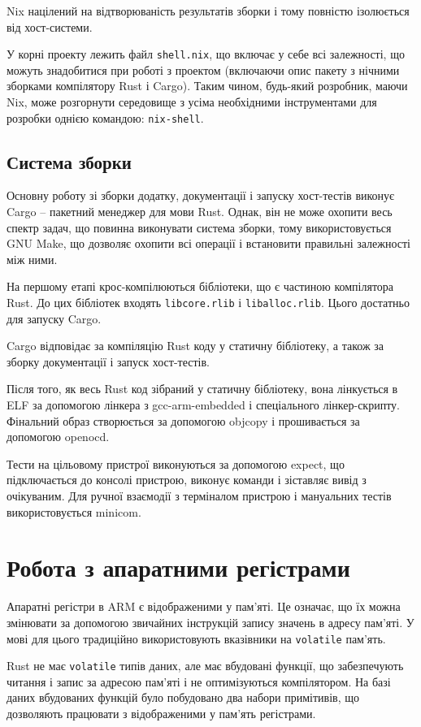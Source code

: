 \documentclass[oneside,14pt,a4paper,final]{myextreport}
\newcommand\code[1]{{\tt #1}}
\begin{document}
Nix націлений на відтворюваність результатів зборки і тому повністю ізолюється від хост-системи.

У корні проекту лежить файл \code{shell.nix}, що включає у себе всі залежності, що можуть знадобитися при роботі з проектом (включаючи опис пакету з нічними зборками компілятору Rust і Cargo). Таким чином, будь-який розробник, маючи Nix, може розгорнути середовище з усіма необхідними інструментами для розробки однією командою: \code{nix-shell}.

\subsection{Система зборки}

Основну роботу зі зборки додатку, документації і запуску хост-тестів виконує Cargo -- пакетний менеджер для мови Rust. Однак, він не може охопити весь спектр задач, що повинна виконувати система зборки, тому використовується GNU Make, що дозволяє охопити всі операції і встановити правильні залежності між ними.

На першому етапі крос-компілюються бібліотеки, що є частиною компілятора Rust. До цих бібліотек входять \code{libcore.rlib} і \code{liballoc.rlib}. Цього достатньо для запуску Cargo.

Cargo відповідає за компіляцію Rust коду у статичну бібліотеку, а також за зборку документації і запуск хост-тестів.

Після того, як весь Rust код зібраний у статичну бібліотеку, вона лінкується в \ac{ELF} за допомогою лінкера з gcc-arm-embedded і спеціального лінкер-скрипту. Фінальний образ створюється за допомогою objcopy і прошивається за допомогою openocd.

Тести на цільовому пристрої виконуються за допомогою expect, що підключається до консолі пристрою, виконує команди і зіставляє вивід з очікуваним. Для ручної взаємодії з терміналом пристрою і мануальних тестів використовується minicom.

\section{Робота з апаратними регістрами}

Апаратні регістри в ARM є відображеними у пам'яті. Це означає, що їх можна змінювати за допомогою звичайних інструкцій запису значень в адресу пам'яті. У мові \LangC{} для цього традиційно використовують вказівники на \code{volatile} пам'ять.

Rust не має \code{volatile} типів даних, але має вбудовані функції, що забезпечують читання і запис за адресою пам'яті і не оптимізуються компілятором. На базі даних вбудованих функцій було побудовано два набори примітивів, що дозволяють працювати з відображеними у пам'ять регістрами.
\end{document}
